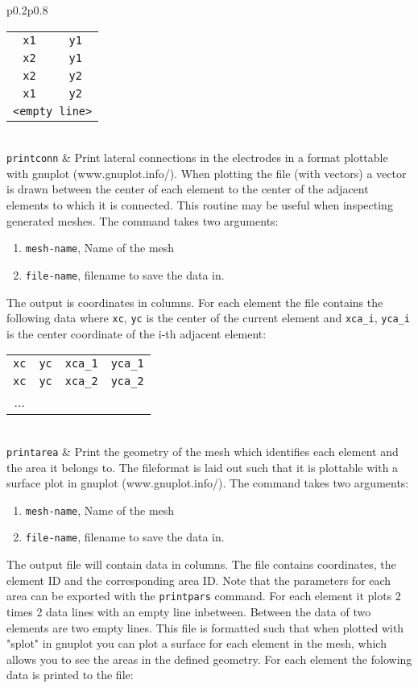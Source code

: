 \documentclass[noshowpacs,preprintnumbers,amsmath,amssymb, letter]{revtex4}
\begin{document}
\begin{longtable}{p{}p{}}
\begin{tabular}{cc}
	\texttt{x1} & \texttt{y1} \\
	\texttt{x2} & \texttt{y1} \\
	\texttt{x2} & \texttt{y2} \\
	\texttt{x1} & \texttt{y2} \\
	\multicolumn{2}{l}{\texttt{<empty line>}}\\
\end{tabular}\\
\texttt{printconn}	& Print lateral connections in the electrodes in a format plottable with gnuplot (www.gnuplot.info/). When plotting the file (with vectors) a vector is drawn between the center of each element to the center of the adjacent elements to which it is connected. This routine may be useful when inspecting generated meshes. The command takes two arguments:
\begin{enumerate}
\item \texttt{mesh-name}, Name of the mesh
\item \texttt{file-name}, filename to save the data in.
\end{enumerate}
The output is coordinates in columns. For each element the file contains the following data where \texttt{xc}, \texttt{yc} is the center of the current element and \texttt{xca\_i}, \texttt{yca\_i} is the center coordinate of the i-th adjacent element: 
\begin{tabular}{cccc}
	\texttt{xc} & \texttt{yc} & \texttt{xca\_1} & \texttt{yca\_1} \\
	\texttt{xc} & \texttt{yc} & \texttt{xca\_2} & \texttt{yca\_2} \\
	... \\
\end{tabular}\\
\texttt{printarea}	& Print the geometry of the mesh which identifies each element and the area it belongs to. The fileformat is laid out such that it is plottable with a surface plot in gnuplot (www.gnuplot.info/).  The command takes two arguments:
\begin{enumerate}
\item \texttt{mesh-name}, Name of the mesh
\item \texttt{file-name}, filename to save the data in.
\end{enumerate}
The output file will contain data in columns. The file contains coordinates, the element ID and the corresponding area ID. Note that the parameters for each area can be exported with  the \texttt{printpars} command. For each element it plots 2 times 2 data lines with an empty line inbetween. Between the data of two elements are two empty lines. This file is formatted such that when plotted with "splot" in gnuplot you can plot a surface for each element in the mesh, which allows you to see the areas in the defined geometry. For each element the folowing data is printed to the file:\newline 

\end{longtable}
\end{document}
